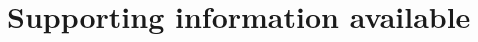 \documentclass[aip,jcp,reprint,noshowkeys,superscriptaddress]{revtex4-1}
\begin{document}
\section*{Supporting information available}
\label{sec:SI}



\end{document}
